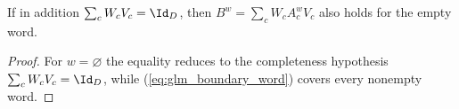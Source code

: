 \begin{lemma}
    \label{thm:glm_boundary_empty_word}
    \leanok
    If in addition $\sum_cW_cV_c=\Id_D$, then
    $B^w=\sum_cW_cA_c^wV_c$ also holds for the empty word.
\end{lemma}
\begin{proof}
    \leanok
    For $w=\varnothing$ the equality reduces to the completeness hypothesis
    $\sum_cW_cV_c=\Id_D$, while (\ref{eq:glm_boundary_word}) covers every
    nonempty word.
\end{proof}
